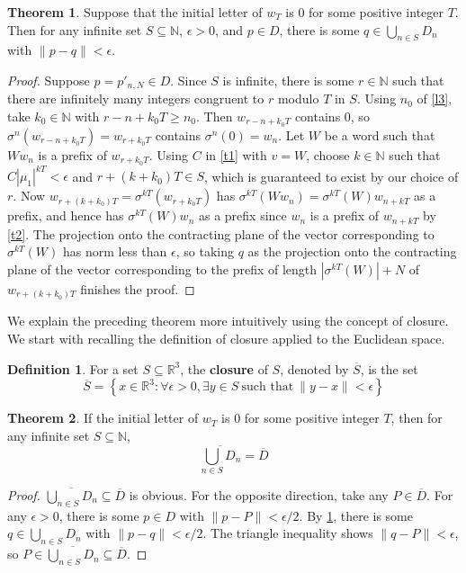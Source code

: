 \documentclass{article}
\theoremstyle{definition}
\newtheorem{theorem}{Theorem}
\newtheorem*{definition}{Definition}
\begin{document}
\begin{theorem}
\label{t3}
Suppose that the initial letter of $w_T$ is $0$ for some positive integer $T$. Then for any infinite set $S\subseteq\mathbb{N}$, $\epsilon>0$, and $p\in D$, there is some $q\in\bigcup_{n\in S}D_n$ with $\|p-q\|<\epsilon$.
\end{theorem}
\begin{proof}
Suppose $p=p'_{n,N}\in D$. Since $S$ is infinite, there is some $r\in\mathbb{N}$ such that there are infinitely many integers congruent to $r$ modulo $T$ in $S$. Using $n_0$ of \cref{l3}, take $k_0\in\mathbb{N}$ with $r-n+k_0T\geq n_0$. Then $w_{r-n+k_0T}$ contains $0$, so $\sigma^n(w_{r-n+k_0T})=w_{r+k_0T}$ contains $\sigma^n(0)=w_n$. Let $W$ be a word such that $Ww_n$ is a prefix of $w_{r+k_0T}$. Using $C$ in \cref{t1} with $v=W$, choose $k\in\mathbb{N}$ such that $C|\mu_1|^{kT}<\epsilon$ and $r+(k+k_0)T\in S$, which is guaranteed to exist by our choice of $r$. Now $w_{r+(k+k_0)T}=\sigma^{kT}(w_{r+k_0T})$ has $\sigma^{kT}(Ww_n)=\sigma^{kT}(W)w_{n+kT}$ as a prefix, and hence has $\sigma^{kT}(W)w_n$ as a prefix since $w_n$ is a prefix of $w_{n+kT}$ by \cref{t2}. The projection onto the contracting plane of the vector corresponding to $\sigma^{kT}(W)$ has norm less than $\epsilon$, so taking $q$ as the projection onto the contracting plane of the vector corresponding to the prefix of length $|\sigma^{kT}(W)|+N$ of $w_{r+(k+k_0)T}$ finishes the proof.
\end{proof}

We explain the preceding theorem more intuitively using the concept of closure. We start with recalling the definition of closure applied to the Euclidean space.

\begin{definition}
For a set $S\subseteq\mathbb{R}^3$, the \textbf{closure} of $S$, denoted by $\overline{S}$, is the set
\[
\overline{S}=\left\{x\in\mathbb{R}^3 : \forall \epsilon>0, \exists y\in S \ \text{such that}\ \|y-x\| <\epsilon \right\}
\]
\end{definition}

\begin{theorem}
\label{t4}
If the initial letter of $w_T$ is $0$ for some positive integer $T$, then for any infinite set $S\subseteq\mathbb{N}$,
\[
\overline{\bigcup_{n\in S}D_n}=\overline{D}
\]
\end{theorem}
\begin{proof}
$\overline{\bigcup_{n\in S}D_n}\subseteq\overline{D}$ is obvious. For the opposite direction, take any $P\in \overline{D}$. For any $\epsilon>0$, there is some $p\in D$ with $\|p-P\|<\epsilon/2$. By \cref{t3}, there is some $q\in\bigcup_{n\in S}D_n$ with $\|p-q\|<\epsilon/2$. The triangle inequality shows $\|q-P\|<\epsilon$, so $P\in\overline{\bigcup_{n\in S}D_n}\subseteq\overline{D}$.
\end{proof}
\end{document}

